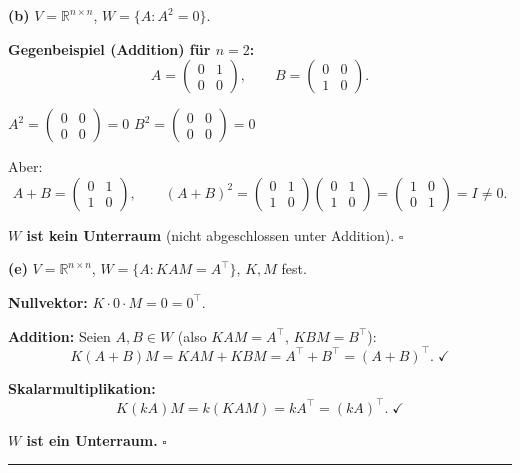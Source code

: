 \documentclass[a4paper,12pt]{article}
\begin{document}
\textbf{(b)} $V = \mathbb{R}^{n \times n}$, \;$W = \{A : A^2 = 0\}$.

\textbf{Gegenbeispiel (Addition) f\"ur $n = 2$:}
\[
A = \begin{pmatrix} 0 & 1 \\ 0 & 0 \end{pmatrix}, \qquad
B = \begin{pmatrix} 0 & 0 \\ 1 & 0 \end{pmatrix}.
\]

$A^2 = \begin{pmatrix} 0 & 0 \\ 0 & 0 \end{pmatrix} = 0$ \;\checkmark \qquad
$B^2 = \begin{pmatrix} 0 & 0 \\ 0 & 0 \end{pmatrix} = 0$ \;\checkmark

Aber:
\[
A + B = \begin{pmatrix} 0 & 1 \\ 1 & 0 \end{pmatrix}, \qquad
(A+B)^2 = \begin{pmatrix} 0 & 1 \\ 1 & 0 \end{pmatrix}
\begin{pmatrix} 0 & 1 \\ 1 & 0 \end{pmatrix}
= \begin{pmatrix} 1 & 0 \\ 0 & 1 \end{pmatrix} = I \neq 0.
\]

\textbf{$W$ ist kein Unterraum} (nicht abgeschlossen unter Addition). $\square$

\bigskip

\textbf{(e)} $V = \mathbb{R}^{n \times n}$, \;$W = \{A : KAM = A^\top\}$, \;$K, M$ fest.

\textbf{Nullvektor:}
$K \cdot 0 \cdot M = 0 = 0^\top$. \;\checkmark

\textbf{Addition:}
Seien $A, B \in W$ (also $KAM = A^\top$, $KBM = B^\top$):
\[
K(A+B)M = KAM + KBM = A^\top + B^\top = (A+B)^\top. \;\checkmark
\]

\textbf{Skalarmultiplikation:}
\[
K(kA)M = k(KAM) = kA^\top = (kA)^\top. \;\checkmark
\]

\textbf{$W$ ist ein Unterraum.} $\square$

\bigskip
\hrule
\bigskip
\end{document}
